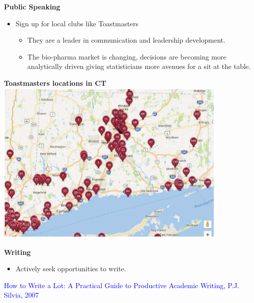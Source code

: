 \documentclass{beamer}
\begin{document}
\begin{frame}
	\center
	\textbf{Public Speaking}\\
	\bigskip
	\begin{itemize}
		\item  Sign up for local clubs like Toastmasters
		\pause
			\begin{itemize}
				\item They are a leader in communication and leadership	development.
				\pause
				\item The bio-pharma market is changing, decisions are becoming
				more analytically driven giving statisticians more avenues for a
				sit at the table.
			\end{itemize}
	\end{itemize}
\end{frame}

\begin{frame}
	\center
	\textbf{Toastmasters locations in CT}
	\includegraphics[width=0.85\textwidth]{toastmaster}
\end{frame}

\begin{frame}
	\center
	\textbf{Writing}\\
	\bigskip
	\begin{itemize}
		\item  Actively seek opportunities to write.
	\end{itemize}
	\pause
	\bigskip
	\textcolor{blue}{How to Write a Lot: A Practical Guide to Productive Academic
		Writing, P.J. Silvia, 2007}
\end{frame}

\end{document}
